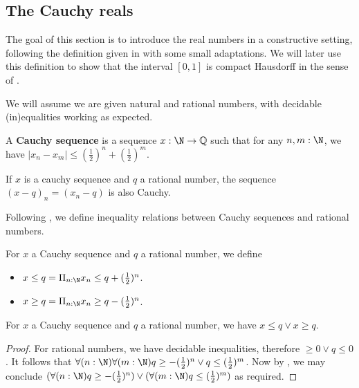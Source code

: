 \subsection{The Cauchy reals}
The goal of this section is to introduce the real numbers in a constructive setting, 
following the definition given in \cite{Bishop} with some small adaptations. 
We will later use this definition to show that the interval $[0,1]$ is compact Hausdorff in the sense 
of . 

We will assume we are given natural and rational numbers, with decidable (in)equalities
working as expected. 

\begin{definition}
  A \textbf{Cauchy sequence} is a sequence $x : \N \to \mathbb Q$ such that
  for any $n,m:\N$, we have %
$|x_n-x_m| \leq (\frac12)^n + (\frac12)^m$. 
\end{definition}
\begin{remark}
  If $x$ is a cauchy sequence and $q$ a rational number, the 
  sequence $(x-q)_n = (x_n-q)$ is also Cauchy.
\end{remark}

Following \cite{Bishop}, we define inequality relations between Cauchy sequences and
rational numbers. 
\begin{definition}
  For $x$ a Cauchy sequence and $q$ a rational number, we define 
  \begin{itemize}
    \item $x\leq  q = \Pi_{n:\N} x_n \leq q+(\frac12)^n$. 
    \item $x\geq  q = \Pi_{n:\N} x_n \geq q-(\frac12)^n$. 
  \end{itemize}
\end{definition}
\begin{lemma}\label{ComparisonLemma}
  For $x$ a Cauchy sequence and $q$ a rational number, we have
  $x \leq q \vee x \geq q$. 
\end{lemma}
\begin{proof}
  For rational numbers, we have decidable inequalities, 
  therefore $\geq 0 \vee q \leq 0$. 
  It follows that 
  $ \forall (n:\N) \forall (m:\N) q \geq -(\frac12)^n \vee q \leq (\frac12)^m$. 
  Now by , we may conclude 
  $ (\forall (n:\N) q \geq -(\frac12)^n ) \vee (\forall (m:\N) q \leq (\frac12)^m)$
  as required.
\end{proof}


